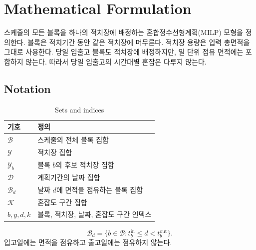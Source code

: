 \documentclass[a4paper,11pt]{article}
\begin{document}
\section{Mathematical Formulation}
스케줄의 모든 블록을 하나의 적치장에 배정하는 혼합정수선형계획(MILP) 모형을 정의한다.
블록은 적치기간 동안 같은 적치장에 머무른다. 적치장 용량은 입력 총면적을 그대로 사용한다.
당일 입출고 블록도 적치장에 배정하지만, 일 단위 점유 면적에는 포함하지 않는다.
따라서 당일 입출고의 시간대별 혼잡은 다루지 않는다.

\subsection{Notation}
\begin{table}[htbp]
\centering
\caption{Sets and indices}
\begin{tabularx}{\linewidth}{lX}
\toprule
기호 & 정의 \\
\midrule
$\mathcal B$ & 스케줄의 전체 블록 집합 \\
$\mathcal Y$ & 적치장 집합 \\
$\mathcal Y_b$ & 블록 $b$의 후보 적치장 집합 \\
$\mathcal D$ & 계획기간의 날짜 집합 \\
$\mathcal B_d$ & 날짜 $d$에 면적을 점유하는 블록 집합 \\
$\mathcal K$ & 혼잡도 구간 집합 \\
$b,y,d,k$ & 블록, 적치장, 날짜, 혼잡도 구간 인덱스 \\
\bottomrule
\end{tabularx}
\end{table}
\begin{equation}
\mathcal B_d=\{b\in\mathcal B:t_b^{\mathrm{in}}\le d<t_b^{\mathrm{out}}\}.
\end{equation}
입고일에는 면적을 점유하고 출고일에는 점유하지 않는다.
\end{document}
